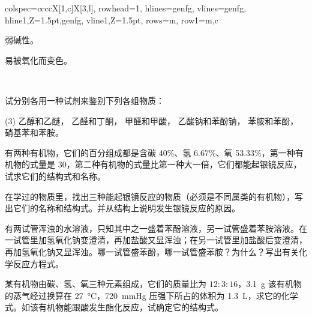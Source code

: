 \begin{landscape}
{\begin{longtblr}[theme=plain]{
  colspec={ccccX[1,c]X[3,l]},
  rowhead=1,
  hlines={genfg},
  vlines={genfg},
  hline{1,Z}={1.5pt,genfg},
  vline{1,Z}={1.5pt},
  rows={m},
  row{1}={m,c}
}
  \begin{minipage}{6.8cm}
    \begin{tabenu}
      \item 弱碱性。 
      \item 易被氧化而变色。 
    \end{tabenu}
  \end{minipage}\\
\end{longtblr}
}
\end{landscape}

\begin{Review}
\begin{question}
  \item 试分别各用一种试剂来鉴别下列各组物质：
  \begin{tasks}(3)
    \task 乙醇和乙醚，
    \task 乙醛和丁酮，
    \task 甲醛和甲酸，
    \task 乙酸钠和苯酚钠，
    \task 苯胺和苯酚，
    \task 硝基苯和苯胺。
  \end{tasks}
  \item 有两种有机物，它们的百分组成都是含碳 40\%、氢 6.67\%、氧 53.33\%，第一种有机物的式量是 30，第二种有机物的式量比第一种大一倍，它们都能起银镜反应，试求它们的结构式和名称。
  \item 在学过的物质里，找出三种能起银镜反应的物质（必须是不同属类的有机物），写出它们的名称和结构式。并从结构上说明发生银镜反应的原因。
  \item 有两试管浑浊的水溶液，只知其中之一盛着苯酚溶液，另一试管盛着苯胺溶液。在一试管里加氢氧化钠变澄清，再加盐酸又显浑浊；在另一试管里加盐酸后变澄清，再加氢氧化钠又显浑浊。哪一试管盛苯酚，哪一试管盛苯胺？为什么？写出有关化学反应方程式。
  \item 某有机物由碳、氢、氧三种元素组成，它们的质量比为 $12:3:16$，\qty{3.1}{g} 该有机物的蒸气经过换算在 \qty{27}{\celsius}，\qty{720}{mmHg} 压强下所占的体积为 \qty{1.3}{L}，求它的化学式。如该有机物能跟酸发生酯化反应，试确定它的结构式。
\end{question}
\end{Review}